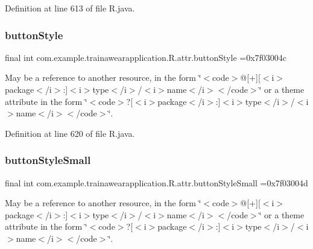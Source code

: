Definition at line 613 of file R.\+java.

\mbox{\label{classcom_1_1example_1_1trainawearapplication_1_1_r_1_1attr_a311b351d06a3707f3a7d0008af07384f}} 
\subsubsection{\texorpdfstring{buttonStyle}{buttonStyle}}
{\footnotesize\ttfamily final int com.\+example.\+trainawearapplication.\+R.\+attr.\+button\+Style =0x7f03004c\hspace{0.3cm}{\ttfamily [static]}}

May be a reference to another resource, in the form \char`\"{}$<$code$>$@\mbox{[}+\mbox{]}\mbox{[}$<$i$>$package$<$/i$>$\+:\mbox{]}$<$i$>$type$<$/i$>$/$<$i$>$name$<$/i$>$$<$/code$>$\char`\"{} or a theme attribute in the form \char`\"{}$<$code$>$?\mbox{[}$<$i$>$package$<$/i$>$\+:\mbox{]}$<$i$>$type$<$/i$>$/$<$i$>$name$<$/i$>$$<$/code$>$\char`\"{}. 

Definition at line 620 of file R.\+java.

\mbox{\label{classcom_1_1example_1_1trainawearapplication_1_1_r_1_1attr_a33590d1b8ee18fee0275e01de0f8e144}} 
\subsubsection{\texorpdfstring{buttonStyleSmall}{buttonStyleSmall}}
{\footnotesize\ttfamily final int com.\+example.\+trainawearapplication.\+R.\+attr.\+button\+Style\+Small =0x7f03004d\hspace{0.3cm}{\ttfamily [static]}}

May be a reference to another resource, in the form \char`\"{}$<$code$>$@\mbox{[}+\mbox{]}\mbox{[}$<$i$>$package$<$/i$>$\+:\mbox{]}$<$i$>$type$<$/i$>$/$<$i$>$name$<$/i$>$$<$/code$>$\char`\"{} or a theme attribute in the form \char`\"{}$<$code$>$?\mbox{[}$<$i$>$package$<$/i$>$\+:\mbox{]}$<$i$>$type$<$/i$>$/$<$i$>$name$<$/i$>$$<$/code$>$\char`\"{}. 

